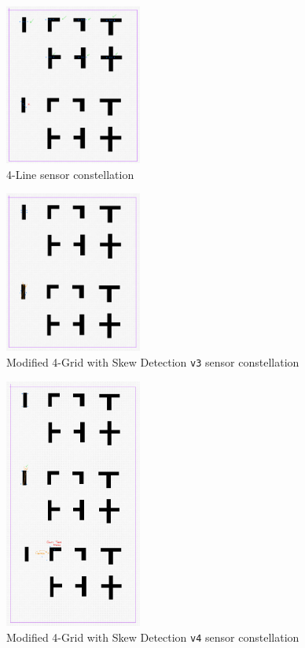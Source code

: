 \documentclass[conference]{IEEEtran}
\begin{document}
\begin{figure}[htbp]
	\centerline{\includegraphics[width=0.4\textwidth]{constellation-4-line.png}}
	\caption{4-Line sensor constellation}
	\label{fig:constellation-4-line}
\end{figure}
\begin{figure}[htbp]
	\centerline{\includegraphics[width=0.4\textwidth]{constellation-4-skew-v3.png}}
	\caption{Modified 4-Grid with Skew Detection \texttt{v3} sensor constellation}
	\label{fig:constellation-4-skew-v3}
\end{figure}
\begin{figure}[htbp]
	\centerline{\includegraphics[width=0.4\textwidth]{constellation-4-skew-v4.png}}
	\caption{Modified 4-Grid with Skew Detection \texttt{v4} sensor constellation}
	\label{fig:constellation-4-skew-v4}
\end{figure}
\end{document}

